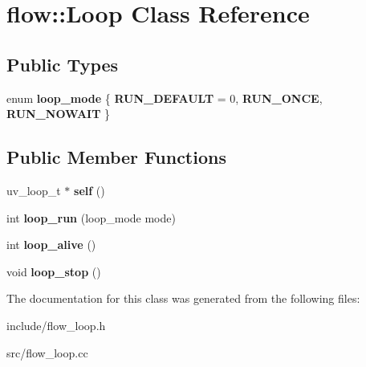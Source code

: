 \hypertarget{classflow_1_1_loop}{}\section{flow\+:\+:Loop Class Reference}
\label{classflow_1_1_loop}
\subsection*{Public Types}
\begin{DoxyCompactItemize}
\item 
enum {\bfseries loop\+\_\+mode} \{ {\bfseries R\+U\+N\+\_\+\+D\+E\+F\+A\+U\+LT} = 0, 
{\bfseries R\+U\+N\+\_\+\+O\+N\+CE}, 
{\bfseries R\+U\+N\+\_\+\+N\+O\+W\+A\+IT}
 \}\hypertarget{classflow_1_1_loop_a847a82c985d40fa9556c08a9f30da46a}{}\label{classflow_1_1_loop_a847a82c985d40fa9556c08a9f30da46a}

\end{DoxyCompactItemize}
\subsection*{Public Member Functions}
\begin{DoxyCompactItemize}
\item 
uv\+\_\+loop\+\_\+t $\ast$ {\bfseries self} ()\hypertarget{classflow_1_1_loop_a994a3eda02be175cedb31b1d44452183}{}\label{classflow_1_1_loop_a994a3eda02be175cedb31b1d44452183}

\item 
int {\bfseries loop\+\_\+run} (loop\+\_\+mode mode)\hypertarget{classflow_1_1_loop_a862f5c0fd74f1ea622507c12c4c1310d}{}\label{classflow_1_1_loop_a862f5c0fd74f1ea622507c12c4c1310d}

\item 
int {\bfseries loop\+\_\+alive} ()\hypertarget{classflow_1_1_loop_a41843bbeaf8964b53ad3991bfb845fde}{}\label{classflow_1_1_loop_a41843bbeaf8964b53ad3991bfb845fde}

\item 
void {\bfseries loop\+\_\+stop} ()\hypertarget{classflow_1_1_loop_a032574a3d4fc48f0c536ba49773a9be0}{}\label{classflow_1_1_loop_a032574a3d4fc48f0c536ba49773a9be0}

\end{DoxyCompactItemize}


The documentation for this class was generated from the following files\+:\begin{DoxyCompactItemize}
\item 
include/flow\+\_\+loop.\+h\item 
src/flow\+\_\+loop.\+cc\end{DoxyCompactItemize}
